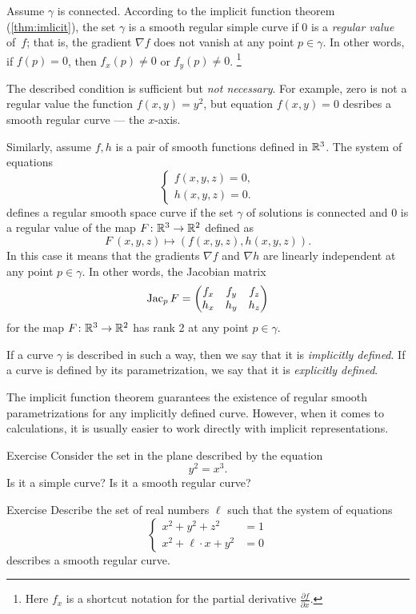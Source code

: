 Assume $\gamma$ is connected.
According to the implicit function theorem (\ref{thm:imlicit}), the set $\gamma$ is a smooth regular simple curve if $0$ is a \emph{regular value} of~$f$; that is, the gradient $\nabla f$ does not vanish at any point $p\in \gamma$.
In other words, if $f(p)=0$, then   
$f_x(p)\ne 0$ or $f_y(p)\ne 0$.%
\footnote{Here $f_x$ is a shortcut notation for the partial derivative
$\tfrac{\partial f}{\partial x}$.}

The described condition is sufficient but {}\emph{not necessary}.
For example, zero is not a regular value the function $f(x,y)=y^2$, but equation $f(x,y)=0$ desribes a smooth regular curve --- the $x$-axis.


Similarly, assume $f,h$ is a pair of smooth functions defined in $\mathbb{R}^3$.
The system of equations
\[\begin{cases}
   f(x,y,z)=0,
   \\
   h(x,y,z)=0.
  \end{cases}
\]
defines a regular smooth space curve if the set $\gamma$ of solutions is connected and $0$ is a regular value of the map $F\colon\mathbb{R}^3\to\mathbb{R}^2$ defined as
\[F\:(x,y,z)\mapsto (f(x,y,z),h(x,y,z)).\]
In this case it means that the gradients $\nabla f$ and $\nabla h$ are linearly independent at any point $p\in \gamma$.
In other words, the Jacobian matrix
\[
\mathop{\rm Jac}\nolimits_pF=\begin{pmatrix}
f_x&f_y&f_z\\
h_x&h_y&h_z
\end{pmatrix}
\]
for the map $F\colon\mathbb{R}^3\to\mathbb{R}^2$ has rank 2 at any point $p \in \gamma$.

If a curve $\gamma$ is described in such a way,
then we say that it is \emph{implicitly defined}.
If a curve is defined by its parametrization, we say that it is \emph{explicitly defined}.

The implicit function theorem guarantees the existence of regular smooth parametrizations for any implicitly defined curve.
However, when it comes to calculations, it is usually easier to work directly with implicit representations. 

\begin{thm}{Exercise}\label{ex:y^2=x^3}
Consider the set in the plane described by the equation
\[y^2=x^3.\]
Is it a simple curve?
Is it a smooth regular curve?
\end{thm}

\begin{thm}{Exercise}\label{ex:viviani}
Describe the set of real numbers $\ell$
such that the system of equations
\[\begin{cases}
x^2+y^2+z^2&=1
\\
x^2+\ell\cdot x+y^2&=0
\end{cases}\]
describes a smooth regular curve.
\end{thm}

